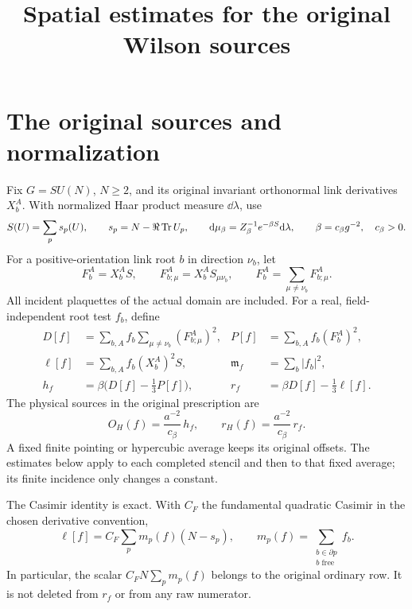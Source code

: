 \documentclass[11pt,letterpaper]{article}
\title{Spatial estimates for the original Wilson sources}\author{}\date{}
\numberwithin{equation}{section}
\theoremstyle{definition}\newtheorem{definition}[theorem]{Definition}
\theoremstyle{remark}\newtheorem{remark}[theorem]{Remark}
\newcommand{\mf}{\mathfrak m_f}\newcommand{\eps}{\varepsilon}
\newcommand{\cG}{c_{\beta}}
\newcommand{\cF}{C_F}
\begin{document}
\maketitle
\section{The original sources and normalization}

Fix $G=SU(N)$, $N\ge2$, and its original invariant orthonormal link derivatives $X_b^A$. With normalized Haar product measure $\dd\lambda$, use
\begin{equation}
 S(U)=\sum_p s_p(U),\qquad s_p=N-\Re\Tr U_p,\qquad
 \dd\mu_{\beta}=Z_{\beta}^{-1}e^{-\beta S}\dd\lambda,
 \qquad \beta=\cG g^{-2},\quad \cG>0.
 \label{eq:Wilson}
\end{equation}
For a positive-orientation link root $b$ in direction $\nu_b$, let
\[
 F_b^A=X_b^AS,\qquad F_{b;\mu}^A=X_b^AS_{\mu\nu_b},\qquad
 F_b^A=\sum_{\mu\ne\nu_b}F_{b;\mu}^A.
\]
All incident plaquettes of the actual domain are included. For a real, field-independent root test $f_b$, define
\begin{align}
 D[f]&=\sum_{b,A}f_b\sum_{\mu\ne\nu_b}(F_{b;\mu}^A)^2,
 &P[f]&=\sum_{b,A}f_b(F_b^A)^2,\\
 \ell[f]&=\sum_{b,A}f_b(X_b^A)^2S,
 &\mf&=\sum_b|f_b|^2,\\
 h_f&=\beta\bigl(D[f]-\tfrac13P[f]\bigr),
 &r_f&=\beta D[f]-\tfrac13\ell[f].
 \label{eq:sources}
\end{align}
The physical sources in the original prescription are
\begin{equation}
 O_H(f)=\frac{a^{-2}}{\cG}\,h_f,
 \qquad r_H(f)=\frac{a^{-2}}{\cG}\,r_f.
 \label{eq:physical}
\end{equation}
A fixed finite pointing or hypercubic average keeps its original offsets. The estimates below apply to each completed stencil and then to that fixed average; its finite incidence only changes a constant.

The Casimir identity is exact. With $\cF$ the fundamental quadratic Casimir in the chosen derivative convention,
\begin{equation}
 \ell[f]=\cF\sum_p m_p(f)(N-s_p),\qquad
 m_p(f)=\sum_{\substack{b\in\partial p\\b\text{ free}}}f_b.
 \label{eq:casimir}
\end{equation}
In particular, the scalar $\cF N\sum_pm_p(f)$ belongs to the original ordinary row. It is not deleted from $r_f$ or from any raw numerator.
\end{document}
